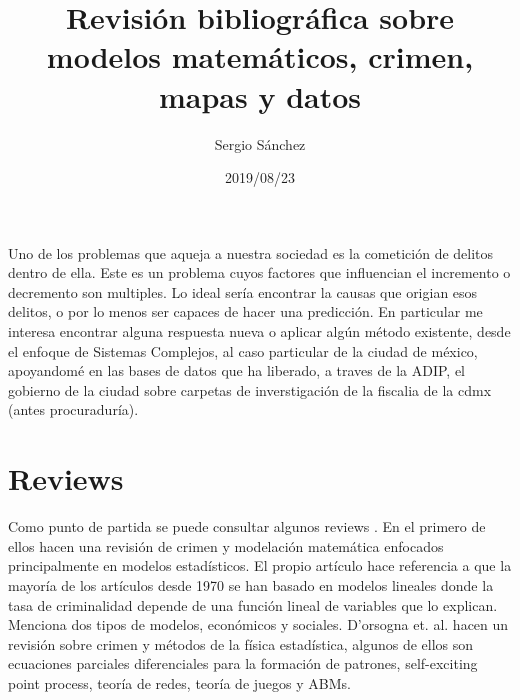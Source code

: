 \documentclass[onecolumn,12pt,letterpaper]{article}
\title{Revisión bibliográfica sobre modelos matemáticos, crimen, mapas y datos}
\author{Sergio Sánchez}
\date{2019/08/23}
\begin{document}
\maketitle

Uno de los problemas que aqueja a nuestra sociedad es la cometición de delitos dentro de ella. Este es un problema cuyos factores que influencian el incremento o decremento son multiples. Lo ideal sería encontrar la causas que origian esos delitos, o por lo menos ser capaces de hacer una predicción. En particular me interesa encontrar alguna respuesta nueva o aplicar algún método existente, desde el enfoque de Sistemas Complejos, al caso particular de la ciudad de méxico, apoyandomé en las bases de datos que ha liberado, a traves de la ADIP, el gobierno de la ciudad sobre carpetas de inverstigación de la fiscalia de la cdmx (antes procuraduría). 



\section{Reviews}

Como punto de partida se puede consultar algunos reviews . En el primero de ellos hacen una revisión de crimen y modelación matemática enfocados principalmente en modelos estadísticos. El propio artículo hace referencia a que la mayoría de los artículos desde 1970 se han basado en modelos lineales donde la tasa de criminalidad depende de una función lineal de variables que lo explican. Menciona dos tipos de modelos, económicos y sociales. D'orsogna et. al.\cite{dorsogna_statistical_2015} hacen un revisión sobre crimen y métodos de la física estadística, algunos de ellos son ecuaciones parciales diferenciales para la formación de patrones, self-exciting point process, teoría de redes, teoría de juegos y ABMs.

\end{document}
